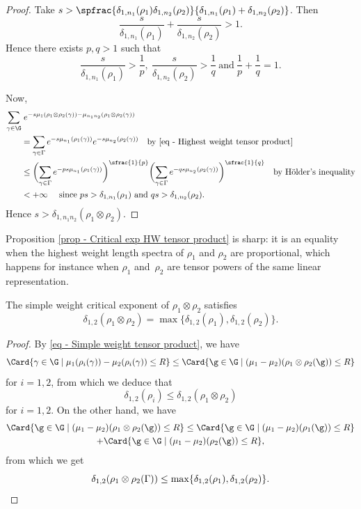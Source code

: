 \begin{proof}
Take $s> \spfrac{\delta_{1,n_1}(\rho_1) \delta_{1,n_2}(\rho_2)}{\delta_{1,n_1}(\rho_1) +\delta_{1,n_2}(\rho_2)}$. Then
\[\frac{s}{\delta_{1,n_1}(\rho_1)}+ \frac{s}{\delta_{1,n_2}(\rho_2)} > 1.\]
Hence there exists $p,q>1$ such that
\[\frac{s}{\delta_{1,n_1}(\rho_1)} > \frac{1}{p},~\frac{s}{\delta_{1,n_2}(\rho_2)} > \frac{1}{q}~\textrm{and}~ \frac{1}{p}+\frac{1}{q}=1.\]

Now,
\begin{align*}
\sum_{\gamma\in \G} &\;e^{-s \mu_1(\rho_1\otimes \rho_2(\gamma)) - \mu_{n_1n_2}(\rho_1\otimes \rho_2(\gamma))}\\
&= \sum_{\gamma \in \Gamma} e^{-s \mu_{n_1}(\rho_1(\gamma))} e^{-s \mu_{n_2}(\rho_2(\gamma))} \quad \textrm{by \eqref{eq - Highest weight tensor product}} \\
&\leq \biggl(\sum_{\gamma\in \Gamma} e^{-ps \mu_{n_1}(\rho_1(\gamma))}\biggr)^{\sfrac{1}{p}}\biggl(\sum_{\gamma\in \Gamma} e^{-qs \mu_{n_2}(\rho_2(\gamma))}\biggr)^{\sfrac{1}{q}} \quad \textrm{by Hölder's inequality}\\
& < +\infty \quad \textrm{ since $ps> \delta_{1,n_1}(\rho_1)$ and $qs > \delta_{1,n_2}(\rho_2)$.}
\end{align*}
Hence $s> \delta_{1,n_1n_2}(\rho_1\otimes \rho_2)$.
\end{proof}

\begin{rmk}
Proposition \ref{prop - Critical exp HW tensor product} is sharp: it is an equality when the highest weight length spectra of $\rho_1$ and $\rho_2$ are proportional, which happens for instance when $\rho_1$ and~$\rho_2$ are tensor powers of the same linear representation.
\end{rmk}

\begin{prop} \label{prop - Critical exp SW tensor product}
The simple weight critical exponent of $\rho_1\otimes \rho_2$ satisfies
\[\delta_{1,2}(\rho_1\otimes \rho_2) = \max \{\delta_{1,2}(\rho_1), \delta_{1,2}(\rho_2)\}.\]
\end{prop}

\begin{proof}
By \eqref{eq - Simple weight tensor product}, we have
\[\Card \{\gamma \in \G \mid \mu_1(\rho_i(\gamma))-\mu_2(\rho_i(\gamma)) \leq R\} \leq \Card \{\g \in \G \mid (\mu_1 - \mu_2)(\rho_1\otimes \rho_2(\g)) \leq R\}\]
for $i=1,2$, from which we deduce that
\[\delta_{1,2}(\rho_i) \leq \delta_{1,2}(\rho_1\otimes \rho_2)\] for $i= 1,2$. On the other hand, we have
\begin{multline*}\Card \{\g \in \G \mid (\mu_1 - \mu_2)(\rho_1\otimes \rho_2(\g)) \leq R\} \leq \Card \{\g \in \G \mid (\mu_1-\mu_2)(\rho_1(\g)) \leq R\}\\
+ \Card \{\g \in \G \mid (\mu_1-\mu_2)(\rho_2(\g)) \leq R\},
\end{multline*}
from which we get
\[\delta_{1,2}(\rho_1\otimes \rho_2(\Gamma)) \leq \max \{\delta_{1,2}(\rho_1), \delta_{1,2}(\rho_2)\}.\qedhere\]
\end{proof}

